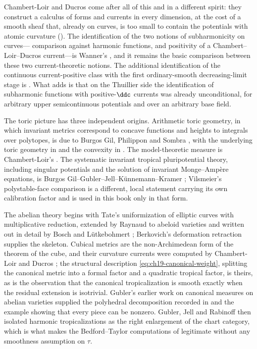 Chambert-Loir and Ducros come after all of this and in a different spirit:
they construct a calculus of forms and currents in every dimension, at the
cost of a smooth sheaf that, already on curves, is too small to contain the
potentials with atomic curvature ().
The identification of the two notions of subharmonicity on curves---
comparison against harmonic functions, and positivity of a
Chambert--Loir--Ducros current---is Wanner's \cite{Wanner19}, and it remains
the basic comparison between these two current-theoretic notions.  The
additional identification of the continuous current-positive class with the
first ordinary-smooth decreasing-limit stage is
.
What
 adds is that on the Thuillier side the
identification of subharmonic functions with positive-$\ddc$ currents was
already unconditional, for arbitrary upper semicontinuous potentials and over
an arbitrary base field.

The toric picture has three independent origins.  Arithmetic toric geometry,
in which invariant metrics correspond to concave functions and heights to
integrals over polytopes, is due to Burgos Gil, Philippon and Sombra
\cite{BGPS14}, with the underlying toric geometry in \cite{Fultor,CLS11} and
the convexity in \cite{Roc70,Sch14}.  The model-theoretic measure is
Chambert-Loir's \cite{CL06}.  The systematic invariant tropical
pluripotential theory, including singular potentials and the solution of
invariant Monge--Amp\`ere equations, is
Burgos Gil--Gubler--Jell--K\"unnemann--Kramer \cite{BGJKK25}; Vilsmeier's
polystable-face comparison \cite{Vil20} is a different, local statement
carrying its own calibration factor and is used in this book only in that
form.

The abelian theory begins with Tate's uniformization of elliptic curves with
multiplicative reduction, extended by Raynaud to abeloid varieties and
written out in detail by Bosch and L\"utkebohmert
\cite{BoschLutkebohmert1993}; Berkovich's deformation retraction
\cite{Berk12} supplies the skeleton.  Cubical metrics are the
non-Archimedean form of the theorem of the cube, and their curvature
currents were computed by Chambert-Loir and Ducros
\cite[Chapter~19]{CLD25}; the structural description
\eqref{eq:ch19-canonical-weight}, splitting the canonical metric into a
formal factor and a quadratic tropical factor, is theirs, as is the
observation that the canonical tropicalization is smooth exactly when the
residual extension is isotrivial.  Gubler's earlier work on canonical
measures on abelian varieties supplied the polyhedral decomposition recorded
in  and the example showing that every piece
can be nonzero.  Gubler, Jell and Rabinoff \cite{GJR26} then isolated
harmonic tropicalizations as the right enlargement of the chart category,
which is what makes the Bedford--Taylor computations of
 legitimate without any smoothness assumption on
$\tau$.

